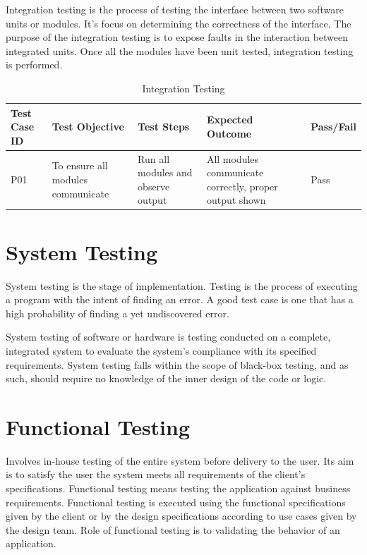 \documentclass[12pt,a4paper,oneside]{report}
\begin{document}
Integration testing is the process of testing the interface between two software units or modules. It's focus on determining the correctness of the interface. The purpose of the integration testing is to expose faults in the interaction between integrated units. Once all the modules have been unit tested, integration testing is performed.

\begin{table}[H]
\centering
\caption{Integration Testing}
\label{tab:integration-testing}
\begin{tabular}{|p{1.5cm}|p{3cm}|p{3cm}|p{2.5cm}|p{1.5cm}|}
\hline
\textbf{Test Case ID} & \textbf{Test Objective} & \textbf{Test Steps} & \textbf{Expected Outcome} & \textbf{Pass/Fail} \\
\hline
P01 & To ensure all modules communicate & Run all modules and observe output & All modules communicate correctly, proper output shown & Pass \\
\hline
\end{tabular}
\end{table}

\section{System Testing}

System testing is the stage of implementation. Testing is the process of executing a program with the intent of finding an error. A good test case is one that has a high probability of finding a yet undiscovered error.

System testing of software or hardware is testing conducted on a complete, integrated system to evaluate the system's compliance with its specified requirements. System testing falls within the scope of black-box testing, and as such, should require no knowledge of the inner design of the code or logic.

\section{Functional Testing}

Involves in-house testing of the entire system before delivery to the user. Its aim is to satisfy the user the system meets all requirements of the client's specifications. Functional testing means testing the application against business requirements. Functional testing is executed using the functional specifications given by the client or by the design specifications according to use cases given by the design team. Role of functional testing is to validating the behavior of an application.
\end{document}
